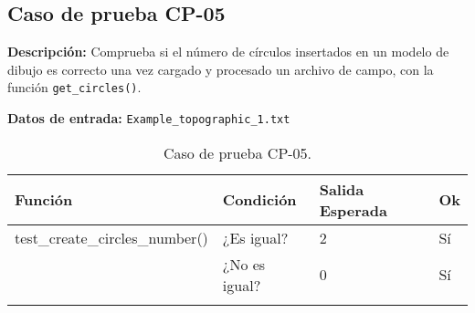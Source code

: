 \subsection{Caso de prueba CP-05}

\textbf{Descripción:} Comprueba si el número de círculos insertados en un modelo de dibujo es correcto una vez cargado y procesado un archivo de campo, con la función \texttt{get\_circles()}.

\textbf{Datos de entrada:} \texttt{Example\_topographic\_1.txt}


\begin{longtable}[]{@{}llll@{}}
\toprule
\begin{minipage}[b]{0.6\columnwidth}\raggedright\strut
Función\strut
\end{minipage} & \begin{minipage}[b]{0.20\columnwidth}\raggedright\strut
Condición\strut
\end{minipage} & \begin{minipage}[b]{0.15\columnwidth}\raggedright\strut
Salida Esperada\strut
\end{minipage} & \begin{minipage}[b]{0.05\columnwidth}\raggedright\strut
Ok\strut
\end{minipage}\tabularnewline
\midrule
\endhead
\begin{minipage}[t]{0.6\columnwidth}\raggedright\strut
\small{test\_create\_circles\_number()}\strut
\end{minipage} & \begin{minipage}[t]{0.20\columnwidth}\raggedright\strut
¿Es igual?\strut
\end{minipage} & \begin{minipage}[t]{0.15\columnwidth}\raggedright\strut
2\strut
\end{minipage} & \begin{minipage}[t]{0.05\columnwidth}\raggedright\strut
Sí\strut
\end{minipage}\tabularnewline
\begin{minipage}[t]{0.6\columnwidth}\raggedright\strut
\strut
\end{minipage} & \begin{minipage}[t]{0.20\columnwidth}\raggedright\strut
¿No es igual?\strut
\end{minipage} & \begin{minipage}[t]{0.15\columnwidth}\raggedright\strut
0\strut
\end{minipage} & \begin{minipage}[t]{0.05\columnwidth}\raggedright\strut
Sí\strut
\end{minipage}\tabularnewline

\bottomrule
\caption{Caso de prueba CP-05.}
\end{longtable}

